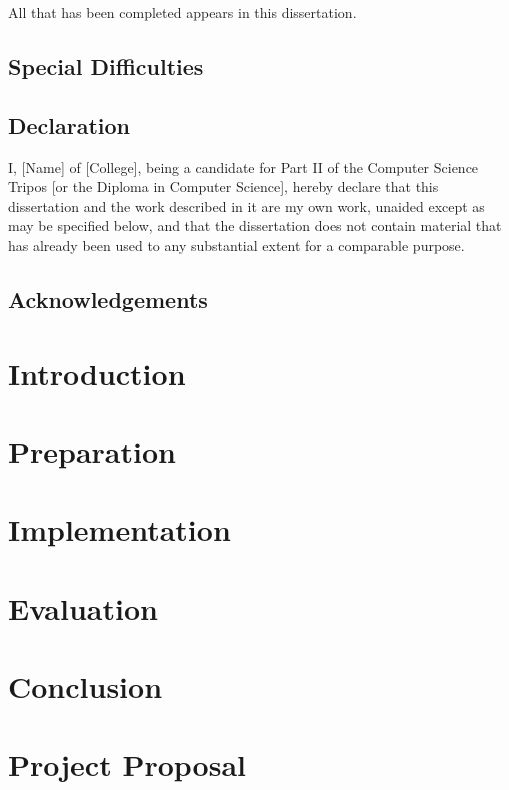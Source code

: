 \documentclass[12pt,a4paper,twoside,openright]{report}
\begin{document}
All that has been completed appears in this dissertation.

\section*{Special Difficulties}
 
\newpage

\section*{Declaration}

I, [Name] of [College], being a candidate for Part II of the Computer
Science Tripos [or the Diploma in Computer Science], hereby declare
that this dissertation and the work described in it are my own work,
unaided except as may be specified below, and that the dissertation
does not contain material that has already been used to any
substantial extent for a comparable purpose.

\bigskip {}

\medskip {}

\tableofcontents

\listoffigures

\newpage

\section*{Acknowledgements}



\pagestyle{headings}

\chapter{Introduction}

\chapter{Preparation}

\chapter{Implementation}

\chapter{Evaluation}

\chapter{Conclusion}



\appendix

\chapter{Project Proposal}
\end{document}
